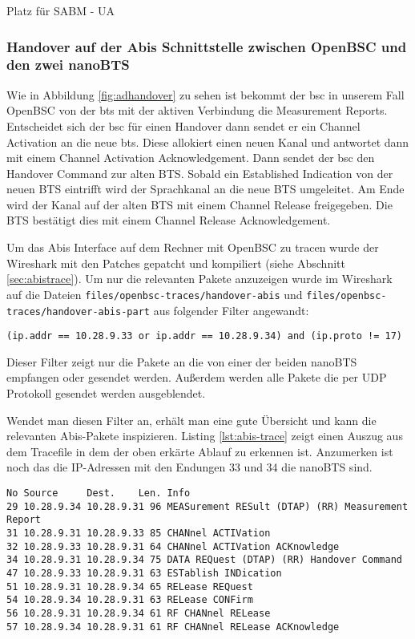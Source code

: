 {\LARGE Platz für SABM - UA}

\subsubsection{Handover auf der Abis Schnittstelle zwischen OpenBSC und den zwei nanoBTS}

Wie in Abbildung \ref{fig:adhandover} zu sehen ist bekommt der \gls{bsc} in unserem Fall OpenBSC von der \gls{bts} mit der aktiven Verbindung die Measurement Reports. Entscheidet sich der \gls{bsc} für einen Handover dann sendet er ein Channel Activation an die neue \gls{bts}. Diese allokiert einen neuen Kanal und antwortet dann mit einem Channel Activation Acknowledgement. Dann sendet der \gls{bsc} den Handover Command zur alten BTS. Sobald ein Established Indication von der neuen BTS eintrifft wird der Sprachkanal an die neue BTS umgeleitet. Am Ende wird der Kanal auf der alten BTS mit einem Channel Release freigegeben. Die BTS bestätigt dies mit einem Channel Release Acknowledgement.

Um das Abis Interface auf dem Rechner mit OpenBSC zu tracen wurde der Wireshark mit den Patches gepatcht und kompiliert (siehe Abschnitt \ref{sec:abistrace}). Um nur die relevanten Pakete anzuzeigen wurde im Wireshark auf die Dateien \lstinline{files/openbsc-traces/handover-abis} und \lstinline{files/openbsc-traces/handover-abis-part} aus \cite{bib:githubfiles} folgender Filter angewandt:

\begin{lstlisting}[numbers=none]
(ip.addr == 10.28.9.33 or ip.addr == 10.28.9.34) and (ip.proto != 17)
\end{lstlisting}

Dieser Filter zeigt nur die Pakete an die von einer der beiden nanoBTS empfangen oder gesendet werden. Außerdem werden alle Pakete die per UDP Protokoll gesendet werden ausgeblendet.

Wendet man diesen Filter an, erhält man eine gute Übersicht und kann die relevanten Abis-Pakete inspizieren. Listing \ref{lst:abis-trace} zeigt einen Auszug aus dem Tracefile in dem der oben erkärte Ablauf zu erkennen ist. Anzumerken ist noch das die IP-Adressen mit den Endungen 33 und 34 die nanoBTS sind.

\begin{lstlisting}[label=lst:abis-trace,caption={Abis Trace mit Handover Nachrichten}]
No Source     Dest.    Len. Info
29 10.28.9.34 10.28.9.31 96	MEASurement RESult (DTAP) (RR) Measurement Report 
31 10.28.9.31 10.28.9.33 85	CHANnel ACTIVation 
32 10.28.9.33 10.28.9.31 64	CHANnel ACTIVation ACKnowledge 
34 10.28.9.31 10.28.9.34 75	DATA REQuest (DTAP) (RR) Handover Command 
47 10.28.9.33 10.28.9.31 63	ESTablish INDication 
51 10.28.9.31 10.28.9.34 65	RELease REQuest 
54 10.28.9.34 10.28.9.31 63	RELease CONFirm 
56 10.28.9.31 10.28.9.34 61	RF CHANnel RELease 
57 10.28.9.34 10.28.9.31 61 RF CHANnel RELease ACKnowledge 
\end{lstlisting}

